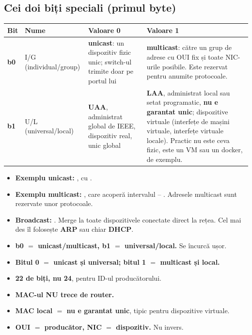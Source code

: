 \documentclass[11pt,a4paper]{article}
\begin{document}
\subsection*{Cei doi biți speciali (primul byte)}
\renewcommand{\arraystretch}{1.35}
\small
\begin{tabularx}{\linewidth}{@{}p{1.1cm} p{2.4cm} Y Y@{}}
\toprule
\textbf{Bit} & \textbf{Nume} & \textbf{Valoare 0} & \textbf{Valoare 1}\\
\midrule
\textbf{b0} & I/G (individual/group) & \textbf{unicast}: un dispozitiv fizic unic; switch-ul trimite doar pe portul lui & \textbf{multicast}: către un grup de adrese cu OUI fix și toate NIC-urile posibile. Este rezervat pentru anumite protocoale.\\
\textbf{b1} & U/L (universal/local) & \textbf{UAA}, administrat global de IEEE, dispozitiv real, unic global & \textbf{LAA}, administrat local sau setat programatic, \textbf{nu e garantat unic}; dispozitive virtuale (interfețe de mașini virtuale, interfețe virtuale locale). Practic nu este ceva fizic, este un VM sau un docker, de exemplu.\\
\bottomrule
\end{tabularx}
\normalsize

\begin{itemize}
  \item \textbf{Exemplu unicast:} , cu .
  \item \textbf{Exemplu multicast:} , care acoperă intervalul  -- . Adresele multicast sunt rezervate unor protocoale.
  \item \textbf{Broadcast:} . Merge la toate dispozitivele conectate direct la rețea. Cel mai des îl folosește \textbf{ARP} sau chiar \textbf{DHCP}.
\end{itemize}

\begin{capcana}
\begin{itemize}
  \item \textbf{b0 $=$ unicast/multicast, b1 $=$ universal/local.} Se încurcă ușor.
  \item \textbf{Bitul 0 $=$ unicast și universal; bitul 1 $=$ multicast și local.}
  \item \textbf{22 de biți, nu 24}, pentru ID-ul producătorului.
  \item \textbf{MAC-ul NU trece de router.}
  \item \textbf{MAC local $=$ nu e garantat unic}, tipic pentru dispozitive virtuale.
  \item \textbf{OUI $=$ producător, NIC $=$ dispozitiv.} Nu invers.
\end{itemize}
\end{capcana}
\end{document}
